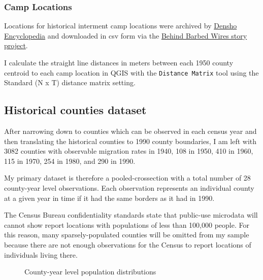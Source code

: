 \documentclass[12pt]{article}
\begin{document}

\subsubsection{Camp Locations}\label{camp-locations}

Locations for historical interment camp locations were archived by
\href{http://encyclopedia.densho.org/War_Relocation_Authority/\#Planning_the_Camps}{Densho
Encyclopedia} and downloaded in csv form via the
\href{https://www.arcgis.com/home/item.html?id=69183af8d45d4f46a9dc4eba99440891}{Behind
Barbed Wires story project}.


I calculate the straight line distances in meters between each 1950
county centroid to each camp location in QGIS with the
\texttt{Distance\ Matrix} tool using the Standard (N x T) distance
matrix setting.

\subsection{Historical counties
dataset}\label{historical-counties-dataset}

After narrowing down to counties which can be observed in each census
year and then translating the historical counties to 1990 county
boundaries, I am left with 3082 counties with observable migration rates
in 1940, 108 in 1950, 410 in 1960, 115 in 1970, 254 in 1980, and 290 in
1990.

My primary dataset is therefore a pooled-crossection with a total number
of 28 county-year level observations. Each observation represents an
individual county at a given year in time if it had the same borders as
it had in 1990.

The Census Bureau confidentiality standards state that public-use
microdata will cannot show report locations with populations of less
than 100,000 people. For this reason, many sparsely-populated counties
will be omitted from my sample because there are not enough observations
for the Census to report locations of individuals living there.

\label{cell-fig-comparesamplepops}
\begin{figure}[H]
\centering{
}
\caption{\label{fig-comparesamplepops}County-year level population
distributions}
\end{figure}%
\end{document}
